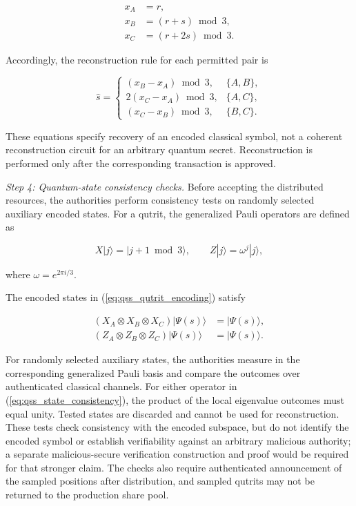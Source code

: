\documentclass[twocolumn,10pt,journal]{IEEEtran}
\begin{document}
\begin{equation}
\begin{aligned}
x_A &= r,\\
x_B &= (r+s)\bmod 3,\\
x_C &= (r+2s)\bmod 3.
\end{aligned}
\label{eq:qss_measurement_relation}
\end{equation}

Accordingly, the reconstruction rule for each permitted
pair is

\begin{equation}
\widehat{s}=\begin{cases}
(x_B-x_A)\bmod 3, & \{A,B\},\\
2(x_C-x_A)\bmod 3, & \{A,C\},\\
(x_C-x_B)\bmod 3, & \{B,C\}.
\end{cases}
\label{eq:qss_pair_recovery}
\end{equation}

These equations specify recovery of an encoded classical
symbol, not a coherent reconstruction circuit for an
arbitrary quantum secret. Reconstruction is performed
only after the corresponding transaction is approved.

\textit{Step 4: Quantum-state consistency checks.}
Before accepting the distributed resources,
the authorities perform consistency tests on
randomly selected auxiliary encoded states.
For a qutrit, the generalized Pauli operators
are defined as

\begin{equation}
X|j\rangle=|j+1\bmod 3\rangle,
\qquad
Z|j\rangle=\omega^j|j\rangle,
\label{eq:qss_qutrit_pauli}
\end{equation}

where $\omega=e^{2\pi i/3}$.

The encoded states in
(\ref{eq:qss_qutrit_encoding}) satisfy

\begin{equation}
\begin{aligned}
(X_A\otimes X_B\otimes X_C)
|\Psi(s)\rangle
&=|\Psi(s)\rangle,\\
(Z_A\otimes Z_B\otimes Z_C)
|\Psi(s)\rangle
&=|\Psi(s)\rangle.
\end{aligned}
\label{eq:qss_state_consistency}
\end{equation}

For randomly selected auxiliary states, the authorities
measure in the corresponding generalized Pauli basis and
compare the outcomes over authenticated classical channels.
For either operator in (\ref{eq:qss_state_consistency}),
the product of the local eigenvalue outcomes must equal
unity. Tested states are discarded and cannot be used
for reconstruction. These tests check consistency with
the encoded subspace, but do not identify the encoded
symbol or establish verifiability against an arbitrary
malicious authority; a separate malicious-secure verification construction
and proof would be required for that stronger claim. The checks
also require authenticated announcement of the sampled positions
after distribution, and sampled qutrits may not be returned to the
production share pool.
\end{document}
